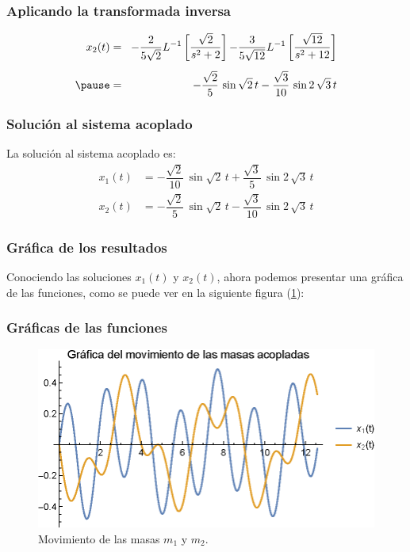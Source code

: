 \begin{frame}
\frametitle{Aplicando la transformada inversa}
\begin{eqnarray*}
x_{2}(t) &=& \! -\dfrac{2}{5 \sqrt{2}} L^{-1} \left[ \dfrac{\sqrt{2}}{s^{2} + 2} \right] {-} \dfrac{3}{5 \sqrt{12}} L^{-1} \left[ \dfrac{\sqrt{12}}{s^{2} + 12} \right] \\[0.5em] \pause
&=& - \dfrac{\sqrt{2}}{5} \, \sin \sqrt{2} \, t - \dfrac{\sqrt{3}}{10} \, \sin 2 \, \sqrt{3} \, t
\end{eqnarray*}
\end{frame}
\begin{frame}
\frametitle{Solución al sistema acoplado}
La solución al sistema acoplado es:
\begin{align*}
x_{1}(t) &= - \dfrac{\sqrt{2}}{10} \, \sin \sqrt{2} \, t + \dfrac{\sqrt{3}}{5} \, \sin 2 \, \sqrt{3} \, t \\[0.5em]
x_{2}(t) &= - \dfrac{\sqrt{2}}{5} \, \sin \sqrt{2} \, t - \dfrac{\sqrt{3}}{10} \, \sin 2 \, \sqrt{3} \, t
\end{align*}
\end{frame}
\begin{frame}
\frametitle{Gráfica de los resultados}
Conociendo las soluciones $x_{1}(t)$ y $x_{2}(t)$, ahora podemos presentar una gráfica de las funciones, como se puede ver en la siguiente figura (\ref{fig:plot_dos_masas_01}):
\end{frame}
\begin{frame}
\frametitle{Gráficas de las funciones}
\begin{figure}
    \centering
    \includegraphics[scale=1]{Imagenes/Ejercicio_masas_acopladas_01.eps}
    \caption{Movimiento de las masas $m_{1}$ y $m_{2}$.}
    \label{fig:plot_dos_masas_01}
\end{figure}
\end{frame}

